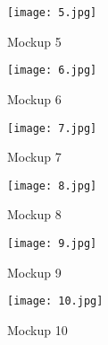 \documentclass[man]{apa7}
\begin{document}
\begin{figure}[H]
\centering
\texttt{[image: 5.jpg]}
\caption{Mockup 5}

\vspace{1cm}

\texttt{[image: 6.jpg]}
\caption{Mockup 6}
\end{figure}

\begin{figure}[H]
\centering
\texttt{[image: 7.jpg]}
\caption{Mockup 7}

\vspace{1cm}

\texttt{[image: 8.jpg]}
\caption{Mockup 8}
\end{figure}

\begin{figure}[H]
\centering
\texttt{[image: 9.jpg]}
\caption{Mockup 9}

\vspace{1cm}

\texttt{[image: 10.jpg]}
\caption{Mockup 10}
\end{figure}
\end{document}
